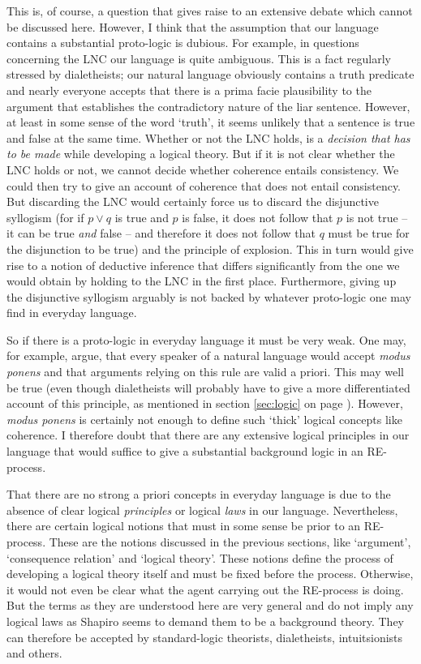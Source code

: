 \documentclass{article}
\begin{document}
This is, of course, a question that gives raise to an extensive debate which cannot be discussed here. However, I think that the assumption that our language contains a substantial proto-logic is dubious. For example, in questions concerning the LNC our language is quite ambiguous. This is a fact regularly stressed by dialetheists; our natural language obviously contains a truth predicate and nearly everyone accepts that there is a prima facie plausibility to the argument that establishes the contradictory nature of the liar sentence. However, at least in some sense of the word `truth', it seems unlikely that a sentence is true and false at the same time. Whether or not the LNC holds, is a \textit{decision that has to be made} while developing a logical theory. But if it is not clear whether the LNC holds or not, we cannot decide whether coherence entails consistency. We could then try to give an account of coherence that does not entail consistency. But discarding the LNC would certainly force us to discard the disjunctive syllogism (for if $p\vee q$ is true and $p$ is false, it does not follow that $p$ is not true -- it can be true \textit{and} false -- and therefore it does not follow that $q$ must be true for the disjunction to be true) and the principle of explosion. This in turn would give rise to a notion of deductive inference that differs significantly from the one we would obtain by holding to the LNC in the first place. Furthermore, giving up the disjunctive syllogism arguably is not backed by whatever proto-logic one may find in everyday language. 

So if there is a proto-logic in everyday language it must be very weak. One may, for example, argue, that every speaker of a natural language would accept \textit{modus ponens} and that arguments relying on this rule are valid a priori. This may well be true (even though dialetheists will probably have to give a more differentiated account of this principle, as mentioned in section \ref{sec:logic} on page \pageref{sec:logic}). However, \textit{modus ponens} is certainly not enough to define such `thick' logical concepts like coherence. I therefore doubt that there are any extensive logical principles in our language that would suffice to give a substantial background logic in an RE-process.

That there are no strong a priori concepts in everyday language is due to the absence of clear logical \textit{principles} or logical \textit{laws} in our language. Nevertheless, there are certain logical notions that must in some sense be prior to an RE-process. These are the notions discussed in the previous sections, like `argument', `consequence relation' and `logical theory'. These notions define the process of developing a logical theory itself and must be fixed before the process. Otherwise, it would not even be clear what the agent carrying out the RE-process is doing. But the terms as they are understood here are very general and do not imply any logical laws as Shapiro seems to demand them to be a background theory. They can therefore be accepted by standard-logic theorists, dialetheists, intuitsionists and others.
\end{document}
